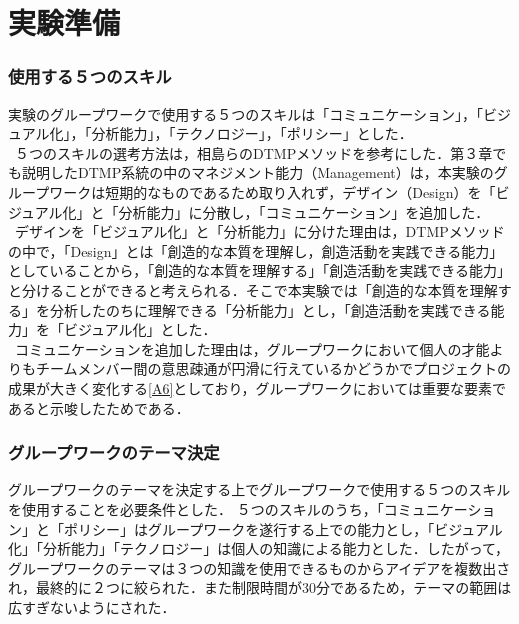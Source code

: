 \documentclass{funthesis}
\begin{document}
\section{実験準備}
\subsubsection{使用する５つのスキル}
実験のグループワークで使用する５つのスキルは「コミュニケーション」，「ビジュアル化」，「分析能力」，「テクノロジー」，「ポリシー」とした．\\
\ ５つのスキルの選考方法は，相島ら\cite{A5}のDTMPメソッドを参考にした．第３章でも説明したDTMP系統の中のマネジメント能力（Management）は，本実験のグループワークは短期的なものであるため取り入れず，デザイン（Design）を「ビジュアル化」と「分析能力」に分散し，「コミュニケーション」を追加した．\\
\ デザインを「ビジュアル化」と「分析能力」に分けた理由は，DTMPメソッドの中で，「Design」とは「創造的な本質を理解し，創造活動を実践できる能力」としていることから，「創造的な本質を理解する」「創造活動を実践できる能力」と分けることができると考えられる．そこで本実験では「創造的な本質を理解する」を分析したのちに理解できる「分析能力」とし，「創造活動を実践できる能力」を「ビジュアル化」とした．\\
\ コミュニケーションを追加した理由は，グループワークにおいて個人の才能よりもチームメンバー間の意思疎通が円滑に行えているかどうかでプロジェクトの成果が大きく変化する\ref{A6}としており，グループワークにおいては重要な要素であると示唆したためである．


\subsubsection{グループワークのテーマ決定}
グループワークのテーマを決定する上でグループワークで使用する５つのスキルを使用することを必要条件とした．
５つのスキルのうち，「コミュニケーション」と「ポリシー」はグループワークを遂行する上での能力とし，「ビジュアル化」「分析能力」「テクノロジー」は個人の知識による能力とした．したがって，グループワークのテーマは３つの知識を使用できるものからアイデアを複数出され，最終的に２つに絞られた．また制限時間が30分であるため，テーマの範囲は広すぎないようにされた．
\end{document}
